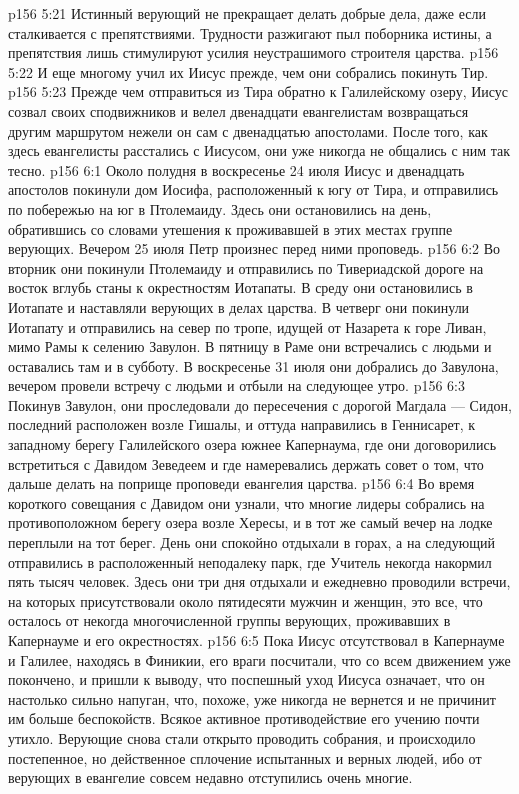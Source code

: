 \vs p156 5:21 Истинный верующий не прекращает делать добрые дела, даже если сталкивается с препятствиями. Трудности разжигают пыл поборника истины, а препятствия лишь стимулируют усилия неустрашимого строителя царства.
\vs p156 5:22 \pc И еще многому учил их Иисус прежде, чем они собрались покинуть Тир.
\vs p156 5:23 Прежде чем отправиться из Тира обратно к Галилейскому озеру, Иисус созвал своих сподвижников и велел двенадцати евангелистам возвращаться другим маршрутом нежели он сам с двенадцатью апостолами. После того, как здесь евангелисты расстались с Иисусом, они уже никогда не общались с ним так тесно.
\vs p156 6:1 Около полудня в воскресенье 24 июля Иисус и двенадцать апостолов покинули дом Иосифа, расположенный к югу от Тира, и отправились по побережью на юг в Птолемаиду. Здесь они остановились на день, обратившись со словами утешения к проживавшей в этих местах группе верующих. Вечером 25 июля Петр произнес перед ними проповедь.
\vs p156 6:2 Во вторник они покинули Птолемаиду и отправились по Тивериадской дороге на восток вглубь станы к окрестностям Иотапаты. В среду они остановились в Иотапате и наставляли верующих в делах царства. В четверг они покинули Иотапату и отправились на север по тропе, идущей от Назарета к горе Ливан, мимо Рамы к селению Завулон. В пятницу в Раме они встречались с людьми и оставались там и в субботу. В воскресенье 31 июля они добрались до Завулона, вечером провели встречу с людьми и отбыли на следующее утро.
\vs p156 6:3 Покинув Завулон, они проследовали до пересечения с дорогой Магдала --- Сидон, последний расположен возле Гишалы, и оттуда направились в Геннисарет, к западному берегу Галилейского озера южнее Капернаума, где они договорились встретиться с Давидом Зеведеем и где намеревались держать совет о том, что дальше делать на поприще проповеди евангелия царства.
\vs p156 6:4 Во время короткого совещания с Давидом они узнали, что многие лидеры собрались на противоположном берегу озера возле Хересы, и в тот же самый вечер на лодке переплыли на тот берег. День они спокойно отдыхали в горах, а на следующий отправились в расположенный неподалеку парк, где Учитель некогда накормил пять тысяч человек. Здесь они три дня отдыхали и ежедневно проводили встречи, на которых присутствовали около пятидесяти мужчин и женщин, это все, что осталось от некогда многочисленной группы верующих, проживавших в Капернауме и его окрестностях.
\vs p156 6:5 \pc Пока Иисус отсутствовал в Капернауме и Галилее, находясь в Финикии, его враги посчитали, что со всем движением уже покончено, и пришли к выводу, что поспешный уход Иисуса означает, что он настолько сильно напуган, что, похоже, уже никогда не вернется и не причинит им больше беспокойств. Всякое активное противодействие его учению почти утихло. Верующие снова стали открыто проводить собрания, и происходило постепенное, но действенное сплочение испытанных и верных людей, ибо от верующих в евангелие совсем недавно отступились очень многие.
